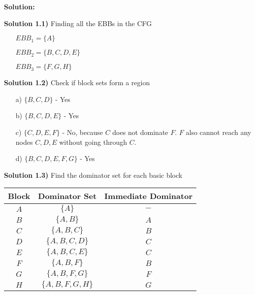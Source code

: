 
\vskip 0.2in

\noindent \textbf{Solution:}

\vskip 0.1in

\noindent \textbf{Solution 1.1)} Finding all the EBBs in the CFG

\begin{enumerate}
    \item[] $EBB_1 = \{A\}$
    \item[] $EBB_2 = \{B, C, D, E\}$
    \item[] $EBB_3 = \{F, G, H\}$
\end{enumerate}

\vskip 0.3in

\noindent \textbf{Solution 1.2)} Check if block sets form a region

\begin{itemize}
    \item[a)] $\{B, C, D\}$ - Yes
    \item[b)] $\{B, C, D, E\}$ - Yes
    \item[c)] $\{C, D, E, F\}$ - No, because $C$ does not dominate $F$. $F$ also cannot reach any nodes $C, D, E$ without going through $C$.
    \item[d)] $\{B, C, D, E, F, G\}$ - Yes
\end{itemize}

\vskip 0.3in

\noindent \textbf{Solution 1.3)} Find the dominator set for each basic block

\vskip 0.2in

\noindent \begin{tabular}{ |c|c|c| }
    \hline
    Block & Dominator Set & Immediate Dominator \\ 
    \hline
    $A$ & $\{A\}$ & $-$ \\ 
    \hline
    $B$ & $\{A, B\}$ & $A$ \\ 
    \hline
    $C$ & $\{A, B, C\}$ & $B$ \\
    \hline
    $D$ & $\{A, B, C, D\}$ & $C$ \\
    \hline
    $E$ & $\{A, B, C, E\}$ & $C$ \\
    \hline
    $F$ & $\{A, B, F\}$ & $B$ \\
    \hline
    $G$ & $\{A, B, F, G\}$ & $F$ \\
    \hline
    $H$ & $\{A, B, F, G, H\}$ & $G$ \\
    \hline
   \end{tabular}

\vskip 0.3in

